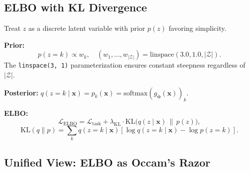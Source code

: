 \documentclass[11pt,a4paper]{article}
\theoremstyle{definition}
\newcommand{\KL}{\mathrm{KL}}
\newcommand{\bx}{\mathbf{x}}
\newcommand{\bphi}{\boldsymbol{\phi}}
\newcommand{\softmax}{\mathrm{softmax}}
\begin{document}
\subsection{ELBO with KL Divergence}
\label{sec:elbo}

Treat $z$ as a discrete latent variable with prior $p(z)$ favoring simplicity.

\textbf{Prior:}
\[
  p(z = k) \propto w_k, \quad (w_1, \ldots, w_{|\mathcal{Z}|}) = \mathrm{linspace}(3.0, 1.0, |\mathcal{Z}|).
\]
The \texttt{linspace(3, 1)} parameterization ensures constant steepness
regardless of $|\mathcal{Z}|$.

\textbf{Posterior:}
$q(z = k \mid \bx) = p_k(\bx) = \softmax(g_\bphi(\bx))_k$.

\textbf{ELBO:}
\begin{equation}
  \mathcal{L}_{\mathrm{ELBO}} = \mathcal{L}_{\mathrm{task}} +
  \lambda_{\mathrm{KL}} \cdot \KL\big(q(z \mid \bx) \,\|\, p(z)\big),
  \label{eq:elbo}
\end{equation}
\begin{equation}
  \KL(q \| p) = \sum_{k} q(z=k \mid \bx) \left[\log q(z=k \mid \bx) - \log p(z=k)\right].
  \label{eq:kl_discrete}
\end{equation}

\subsection{Unified View: ELBO as Occam's Razor}
\end{document}
